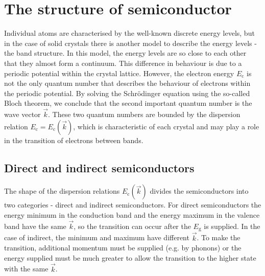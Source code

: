 \section{The structure of semiconductor}
Individual atoms are characterised by the well-known discrete energy levels, but in the case of solid crystals there is another model to describe the energy levels - the band structure. In this model, the energy levels are so close to each other that they almost form a continuum. This difference in behaviour is due to a periodic potential within the crystal lattice. However, the electron energy $E_{\textrm{c}}$ is not the only quantum number that describes the behaviour of electrons within the periodic potential. By solving the Schrödinger equation using the so-called Bloch theorem, we conclude that the second important quantum number is the wave vector $\vec{k}$. These two quantum numbers are bounded by the dispersion relation $E_{\textrm{c}} = E_{\textrm{c}}(\vec{k})$, which is characteristic of each crystal and may play a role in the transition of electrons between bands.



\subsection{Direct and indirect semiconductors}
The shape of the dispersion relations $E_{\textrm{c}}(\vec{k})$ divides the semiconductors into two categories - direct and indirect semiconductors. For direct semiconductors the energy minimum in the conduction band and the energy maximum in the valence band have the same $\vec{k}$, so the transition can occur after the $E_{\textrm{g}}$ is supplied. In the case of indirect, the minimum and maximum have different $\vec{k}$. To make the transition, additional momentum must be supplied (e.g. by phonons) or the energy supplied must be much greater to allow the transition to the higher state with the same $\vec{k}$.  
 
